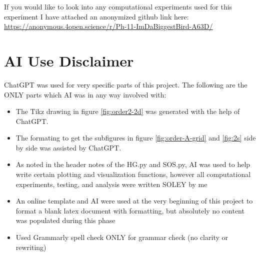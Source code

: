\documentclass[11pt,a4paper]{article}
\numberwithin{equation}{section}
\theoremstyle{definition}
\theoremstyle{assumption}
\begin{document}
If you would like to look into any computational experiments used for this
experiment I have attached an anonymized github link here: \\
\url{https://anonymous.4open.science/r/Ph-11-ImDaBiggestBird-A63D/}

\section{AI Use Disclaimer}
ChatGPT was used for very specific parts of this
project. The following are the ONLY parts which AI was 
in any way involved with:
\begin{itemize}
    \item The Tikz drawing in figure \ref{fig:order2-2d} was generated with the help of ChatGPT.
    
    \item The formating to get the subfigures in figure \ref{fig:order-A-grid} and \ref{fig:2s} side by side was 
    assisted by ChatGPT.

    \item As noted in the header notes of the HG.py and SOS.py, AI was used to 
    help write certain plotting and visualization functions, however all computational experiments, testing,
    and analysis were written SOLEY by me
    \item An online template and AI were used at the very beginning
    of this project to format a blank latex document with formatting, 
    but absolutely no content was populated during this phase
    \item Used Grammarly spell check ONLY for grammar check (no clarity or rewriting)

\end{itemize}

\printbibliography
\end{document}
